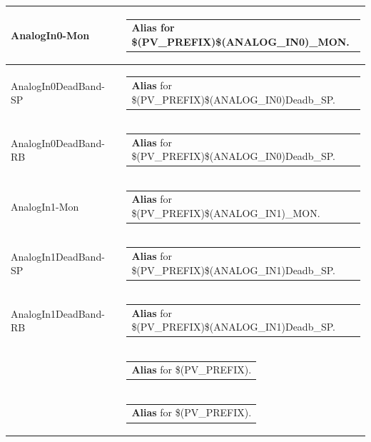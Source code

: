\documentclass[openany]{article}
\begin{document}
\begin{longtable}{| m{4.5cm} m{2.5cm}  m{8.0cm} |}
        AnalogIn0-Mon &  & \begin{tabular}{@{}m{6cm}@{}}
                \textbf{Alias} for \$(PV\_PREFIX)\$(ANALOG\_IN0)\_MON.
            \end{tabular} \hypertarget{}{}\\ \hline
        AnalogIn0DeadBand-SP &  & \begin{tabular}{@{}m{6cm}@{}}
                \textbf{Alias} for \$(PV\_PREFIX)\$(ANALOG\_IN0)Deadb\_SP.
            \end{tabular} \hypertarget{}{}\\ \hline
        AnalogIn0DeadBand-RB &  & \begin{tabular}{@{}m{6cm}@{}}
                \textbf{Alias} for \$(PV\_PREFIX)\$(ANALOG\_IN0)Deadb\_SP.
            \end{tabular} \hypertarget{}{}\\ \hline
        AnalogIn1-Mon &  & \begin{tabular}{@{}m{6cm}@{}}
                \textbf{Alias} for \$(PV\_PREFIX)\$(ANALOG\_IN1)\_MON.
            \end{tabular} \hypertarget{}{}\\ \hline
        AnalogIn1DeadBand-SP &  & \begin{tabular}{@{}m{6cm}@{}}
                \textbf{Alias} for \$(PV\_PREFIX)\$(ANALOG\_IN1)Deadb\_SP.
            \end{tabular} \hypertarget{}{}\\ \hline
        AnalogIn1DeadBand-RB &  & \begin{tabular}{@{}m{6cm}@{}}
                \textbf{Alias} for \$(PV\_PREFIX)\$(ANALOG\_IN1)Deadb\_SP.
            \end{tabular} \hypertarget{}{}\\ \hline
         &  & \begin{tabular}{@{}m{6cm}@{}}
                \textbf{Alias} for \$(PV\_PREFIX).
            \end{tabular} \hypertarget{}{}\\ \hline
         &  & \begin{tabular}{@{}m{6cm}@{}}
                \textbf{Alias} for \$(PV\_PREFIX).
            \end{tabular} \hypertarget{}{}\\ \hline
    \end{longtable}
\end{document}
